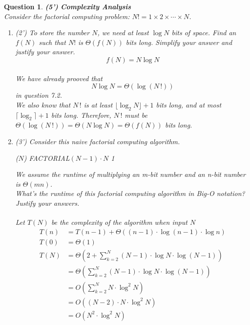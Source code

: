 \documentclass[10.5pt]{article}
\newtheorem{Q}{Question}
\begin{document}
\begin{Q}
\textbf{(5')} \textbf{Complexity Analysis}
\\
Consider the factorial computing problem: $N! = 1 \times 2 \times \cdots \times N $.
\begin{enumerate}
    \item (2') To store the number $N$, we need at least $\log N$ bits of space. Find an $f(N)$ such that $N!$ is $\Theta(f(N))$ bits long. Simplify your answer and justify your answer.\\
    $$f(N) = N\log N$$\\
		\textup{We have already prooved that} 
		$$N\log N =\Theta(\log (N\,!))$$
		\textup{in question 7.2.}\\
		\textup{We also know that} $N\,!$ \textup{is at least }$\lfloor\log_2 N\rfloor + 1$ \textup{bits long, and at most }$\lceil\log_2\rceil + 1$ \textup{bits long. Therefore, }$N \, !$\textup{ must be }$\Theta(\log (N\, !)) = \Theta(N \log N) = \Theta(f(N))$\textup{ bits long.}
    \item (3') Consider this naive factorial computing algorithm.
        \algnewcommand{}
        \algnewcommand\RETURN{\State \algorithmicreturn}%
        \algnewcommand{}
        \algnewcommand\PROCEDURE{\item[\algorithmicprocedure]}%
        \algnewcommand{}
        \algnewcommand\ENDPROCEDURE{\item[\algorithmicendprocedure]}%
        \begin{algorithmic}
        ({$N$})
        \RETURN{} {{FACTORIAL}$(N-1) \cdot N$}
        \ELSE
        \RETURN{} 1
        \ENDIF

        \ENDPROCEDURE
        \end{algorithmic}
    We assume the runtime of multiplying an m-bit number and an n-bit number is $\Theta(mn)$.\\
    What's the runtime of this factorial computing algorithm in Big-O notation? Justify your answers.\\
		\\
		\textup{Let }$T(N)$\textup{ be the complexity of the algorithm when input }$N$
		\begin{align*}
			T(n) &= T(n-1) + \Theta\left((n-1)\cdot\log(n-1)\cdot\log n\right)\\
			T(0) &= \Theta(1)\\
			T(N) &= \Theta\left(2 +\sum_{k=2}^N (N-1)\cdot\log N\cdot \log (N-1)\right)\\
			&=\Theta\left(\sum_{k=2}^N(N-1)\cdot\log N\cdot\log (N-1)\right)\\
			&=O\left(\sum_{k = 2}^N N\cdot\log^2 N\right)\\
			&=O\left((N-2)\cdot N\cdot \log^2 N\right)\\
			&=O\left(N^2\cdot\log^2 N\right)
		\end{align*}

        

\end{enumerate}

\end{Q}
	
\end{document}
